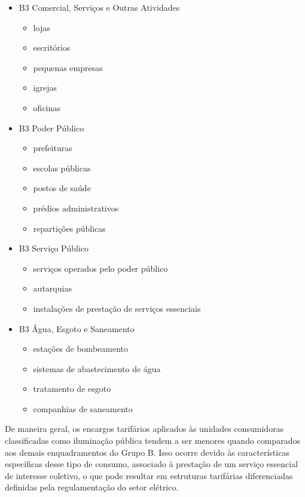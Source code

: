 \documentclass[12pt,a4paper]{article}
\begin{document}
\begin{itemize}

    \item B3 Comercial, Serviços e Outras Atividades
    \begin{itemize}
        \item lojas
        \item escritórios
        \item pequenas empresas
        \item igrejas
        \item oficinas
    \end{itemize}

    \item B3 Poder Público
    \begin{itemize}
        \item prefeituras
        \item escolas públicas
        \item postos de saúde
        \item prédios administrativos
        \item repartições públicas
    \end{itemize}

    \item B3 Serviço Público
    \begin{itemize}
        \item serviços operados pelo poder público
        \item autarquias
        \item instalações de prestação de serviços essenciais
    \end{itemize}

    \item B3 Água, Esgoto e Saneamento
    \begin{itemize}
        \item estações de bombeamento
        \item sistemas de abastecimento de água
        \item tratamento de esgoto
        \item companhias de saneamento
    \end{itemize}

\end{itemize}

De maneira geral, os encargos tarifários aplicados às unidades consumidoras classificadas como iluminação pública tendem a ser menores quando comparados aos demais enquadramentos do Grupo B. Isso ocorre devido às características específicas desse tipo de consumo, associado à prestação de um serviço essencial de interesse coletivo, o que pode resultar em estruturas tarifárias diferenciadas definidas pela regulamentação do setor elétrico.
\end{document}
